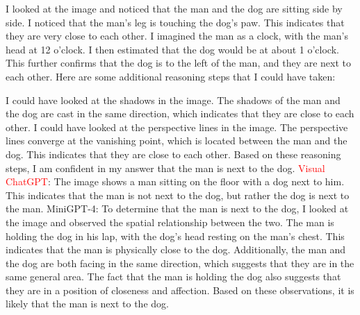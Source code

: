 \begin{enumerate}
        I looked at the image and noticed that the man and the dog are sitting side by side.
        I noticed that the man's leg is touching the dog's paw. This indicates that they are very close to each other.
        I imagined the man as a clock, with the man's head at 12 o'clock. I then estimated that the dog would be at about 1 o'clock. This further confirms that the dog is to the left of the man, and they are next to each other.
        Here are some additional reasoning steps that I could have taken:
        
        I could have looked at the shadows in the image. The shadows of the man and the dog are cast in the same direction, which indicates that they are close to each other.
        I could have looked at the perspective lines in the image. The perspective lines converge at the vanishing point, which is located between the man and the dog. This indicates that they are close to each other.
        Based on these reasoning steps, I am confident in my answer that the man is next to the dog.
        \subitem \textcolor{red}{Visual ChatGPT}: The image shows a man sitting on the floor with a dog next to him. This indicates that the man is not next to the dog, but rather the dog is next to the man.
        \subitem MiniGPT-4: To determine that the man is next to the dog, I looked at the image and observed the spatial relationship between the two. The man is holding the dog in his lap, with the dog’s head resting on the man’s chest. This indicates that the man is physically close to the dog. Additionally, the man and the dog are both facing in the same direction, which suggests that they are in the same general area. The fact that the man is holding the dog also suggests that they are in a position of closeness and affection. Based on these observations, it is likely that the man is next to the dog.
    \end{enumerate}
